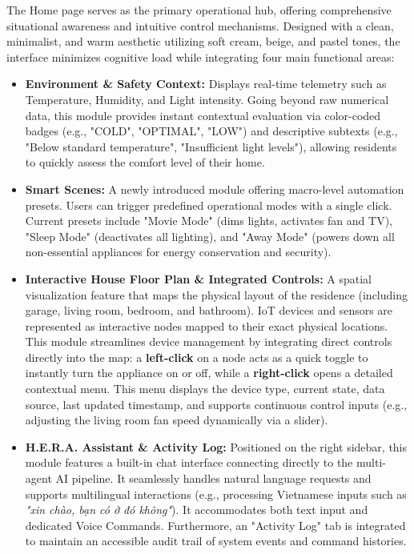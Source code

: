 The Home page serves as the primary operational hub, offering comprehensive situational awareness and intuitive control mechanisms. Designed with a clean, minimalist, and warm aesthetic utilizing soft cream, beige, and pastel tones, the interface minimizes cognitive load while integrating four main functional areas:

\begin{itemize}
    \item \textbf{Environment \& Safety Context:} Displays real-time telemetry such as Temperature, Humidity, and Light intensity. Going beyond raw numerical data, this module provides instant contextual evaluation via color-coded badges (e.g., "COLD", "OPTIMAL", "LOW") and descriptive subtexts (e.g., "Below standard temperature", "Insufficient light levels"), allowing residents to quickly assess the comfort level of their home.

    \item \textbf{Smart Scenes:} A newly introduced module offering macro-level automation presets. Users can trigger predefined operational modes with a single click. Current presets include "Movie Mode" (dims lights, activates fan and TV), "Sleep Mode" (deactivates all lighting), and "Away Mode" (powers down all non-essential appliances for energy conservation and security).

    \item \textbf{Interactive House Floor Plan \& Integrated Controls:} A spatial visualization feature that maps the physical layout of the residence (including garage, living room, bedroom, and bathroom). IoT devices and sensors are represented as interactive nodes mapped to their exact physical locations. This module streamlines device management by integrating direct controls directly into the map: a \textbf{left-click} on a node acts as a quick toggle to instantly turn the appliance on or off, while a \textbf{right-click} opens a detailed contextual menu. This menu displays the device type, current state, data source, last updated timestamp, and supports continuous control inputs (e.g., adjusting the living room fan speed dynamically via a slider).

    \item \textbf{H.E.R.A. Assistant \& Activity Log:} Positioned on the right sidebar, this module features a built-in chat interface connecting directly to the multi-agent AI pipeline. It seamlessly handles natural language requests and supports multilingual interactions (e.g., processing Vietnamese inputs such as \textit{"xin chào, bạn có ở đó không"}). It accommodates both text input and dedicated Voice Commands. Furthermore, an "Activity Log" tab is integrated to maintain an accessible audit trail of system events and command histories.
\end{itemize}


